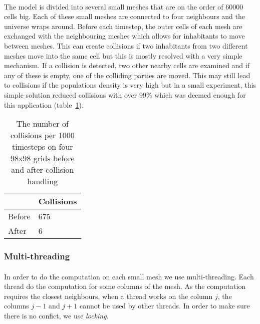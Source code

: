 \documentclass{article}
\begin{document}
\paragraph{}
The model is divided into several small meshes that are on the order of 60000 cells big. Each of these small meshes are connected to four neighbours and the universe wraps around. Before each timestep, the outer cells of each mesh are exchanged with the neighbouring meshes which allows for inhabitants to move between meshes. This can create collisions if two inhabitants from two different meshes move into the same cell but this is mostly resolved with a very simple mechanism. If a collision is detected, two other nearby cells are examined and if any of these is empty, one of the colliding parties are moved. This may still lead to collisions if the populations density is very high but in a small experiment, this simple solution reduced collisions with over 99\% which was deemed enough for this application (table~\ref{collisions}).

\begin{table}[h!]
\centering
\begin{tabular}{|l|l|}
\hline
& Collisions\\
\hline
Before & 675\\
\hline
After & 6\\
\hline
\end{tabular}
\caption{The number of collisions per 1000 timesteps on four 98x98 grids before and after collision handling}
\label{collisions}
\end{table}

\subsubsection{Multi-threading}

\paragraph{}
In order to do the computation on each small mesh we use multi-threading. Each thread do the computation for some columns of the mesh. As the computation requires the closest neighbours, when a thread works on the column $j$, the columns $j-1$ and $j+1$ cannot be used by other threads. In order to make sure there is no confict, we use \emph{locking}.
\end{document}
